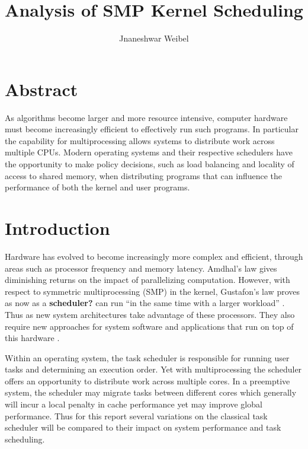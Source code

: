 \documentclass[11pt]{article}
\title{Analysis of SMP Kernel Scheduling}
\author{Jnaneshwar Weibel}
\begin{document}
\maketitle

\section*{Abstract}
\label{sec:abstract}
As algorithms become larger and more resource intensive, computer hardware must become increasingly efficient to effectively run such programs.  In particular the capability for multiprocessing allows systems to distribute work across multiple CPUs.  Modern operating systems and their respective schedulers have the opportunity to make policy decisions, such as load balancing and locality of access to shared memory, when distributing programs that can influence the performance of both the kernel and user programs.



\section{Introduction}
\label{sec:introduction}
Hardware has evolved to become increasingly more complex and efficient, through areas such as processor frequency and memory latency.  Amdhal's law gives diminishing returns on the impact of parallelizing computation.  However, with respect to symmetric multiprocessing (SMP) in the kernel, Gustafon's law proves as now as a \textbf{scheduler?} can run ``in the same time with a larger workload'' \cite{gustafon}.  Thus as new system architectures take advantage of these processors.  They also require new approaches for system software and applications that run on top of this hardware \cite{nitrd}.

Within an operating system, the task scheduler is responsible for running user tasks and determining an execution order.  Yet with multiprocessing the scheduler offers an opportunity to distribute work across multiple cores.  In a preemptive system, the scheduler may migrate tasks between different cores which generally will incur a local penalty in cache performance yet may improve global performance.  Thus for this report several variations on the classical task scheduler will be compared to their impact on system performance and task scheduling.
\end{document}
